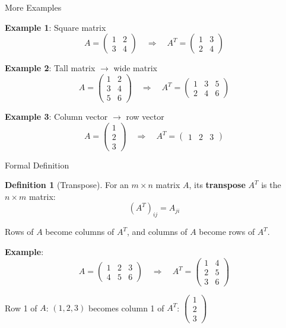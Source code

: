 \documentclass[10pt]{beamer}
\theoremstyle{definition}
\newtheorem{defi}{Definition}[section]
\newcommand{\x}[1]{\alert{\textbf{#1}}}
\begin{document}
\begin{frame}{More Examples}

\x{Example 1}: Square matrix
$$A = \begin{pmatrix} 1 & 2 \\ 3 & 4 \end{pmatrix} \quad \Rightarrow \quad A^T = \begin{pmatrix} 1 & 3 \\ 2 & 4 \end{pmatrix}$$

\vspace{1em}

\x{Example 2}: Tall matrix $\to$ wide matrix
$$A = \begin{pmatrix} 1 & 2 \\ 3 & 4 \\ 5 & 6 \end{pmatrix} \quad \Rightarrow \quad A^T = \begin{pmatrix} 1 & 3 & 5 \\ 2 & 4 & 6 \end{pmatrix}$$

\vspace{1em}

\x{Example 3}: Column vector $\to$ row vector
$$A = \begin{pmatrix} 1 \\ 2 \\ 3 \end{pmatrix} \quad \Rightarrow \quad A^T = \begin{pmatrix} 1 & 2 & 3 \end{pmatrix}$$

\end{frame}

\begin{frame}{Formal Definition}

\begin{defi}[Transpose]
For an $m \times n$ matrix $A$, its \x{transpose} $A^T$ is the $n \times m$ matrix:
$$(A^T)_{ij} = A_{ji}$$

Rows of $A$ become columns of $A^T$, and columns of $A$ become rows of $A^T$.
\end{defi}

\vspace{1em}

\x{Example}:
$$A = \begin{pmatrix} 1 & 2 & 3 \\ 4 & 5 & 6 \end{pmatrix} \quad \Rightarrow \quad A^T = \begin{pmatrix} 1 & 4 \\ 2 & 5 \\ 3 & 6 \end{pmatrix}$$

\vspace{1em}

Row 1 of $A$: $(1, 2, 3)$ becomes column 1 of $A^T$: $\begin{pmatrix} 1\\2\\3 \end{pmatrix}$

\end{frame}
\end{document}

